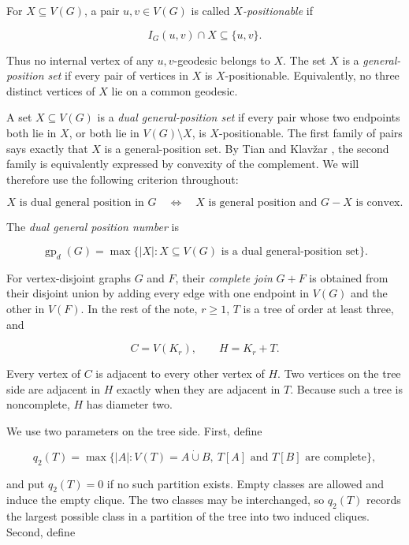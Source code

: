 \documentclass[11pt,a4paper]{article}
\providecommand{\Needspace}[1]{}
\numberwithin{equation}{section}
\begin{document}
For \(X\subseteq V(G)\), a pair \(u,v\in V(G)\) is called
\emph{\(X\)-positionable} if

\[
I_G(u,v)\cap X\subseteq\{u,v\}.
\]

Thus no internal vertex of any \(u,v\)-geodesic belongs to \(X\). The
set \(X\) is a \emph{general-position set} if every pair of vertices in
\(X\) is \(X\)-positionable. Equivalently, no three distinct vertices of
\(X\) lie on a common geodesic.

A set \(X\subseteq V(G)\) is a \emph{dual general-position set} if every
pair whose two endpoints both lie in \(X\), or both lie in
\(V(G)\setminus X\), is \(X\)-positionable. The first family of pairs
says exactly that \(X\) is a general-position set. By Tian and Klav\v{z}ar
\cite[Theorem 3.1]{tian-klavzar-variety}, the second family is equivalently expressed by
convexity of the complement. We will therefore use the following
criterion throughout:

\nopagebreak[4]
\[
X\text{ is dual general position in }G
\quad\Longleftrightarrow\quad
X\text{ is general position and }G-X\text{ is convex}.
\]

\Needspace{6\baselineskip}
The \emph{dual general position number} is

\[
\operatorname{gp}_d(G)=
\max\{|X|:X\subseteq V(G)\text{ is a dual general-position set}\}.
\]

For vertex-disjoint graphs \(G\) and \(F\), their \emph{complete join}
\(G+F\) is obtained from their disjoint union by adding every edge with
one endpoint in \(V(G)\) and the other in \(V(F)\). In the rest of the
note, \(r\ge 1\), \(T\) is a tree of order at least three, and

\[
C=V(K_r),\qquad H=K_r+T.
\]

Every vertex of \(C\) is adjacent to every other vertex of \(H\). Two
vertices on the tree side are adjacent in \(H\) exactly when they are
adjacent in \(T\). Because such a tree is noncomplete, \(H\) has
diameter two.

We use two parameters on the tree side. First, define

\[
q_2(T)=\max\{|A|:V(T)=A\mathbin{\dot\cup}B,
\ T[A]\text{ and }T[B]\text{ are complete}\},
\]

and put \(q_2(T)=0\) if no such partition exists. Empty classes are
allowed and induce the empty clique. The two classes may be
interchanged, so \(q_2(T)\) records the largest possible class in a
partition of the tree into two induced cliques. Second, define
\end{document}
